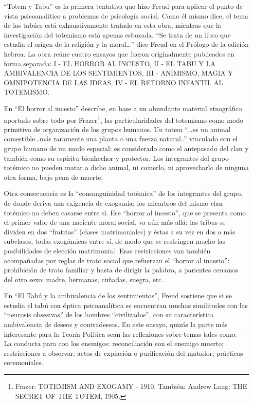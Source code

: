 \documentclass[
]{book}
\begin{document}
``Totem y Tabu'' es la primera tentativa que hizo Freud para aplicar el punto de vista psicoanalítico a problemas de psicología social. Como él mismo dice, el tema de los tabúes está exhaustivamente tratado en esta obra, mientras que la investigación del totemismo está apenas esbozada. ``Se trata de un libro que estudia el orígen de la religión y la moral\ldots{}'' dice Freud en el Prólogo de la edición hebrea. La obra reúne cuatro ensayos que fueron originalmente publicados en forma separada: I - EL HORROR AL INCESTO, II - EL TABU Y LA AMBIVALENCIA DE LOS SENTIMIENTOS, III - ANIMISMO, MAGIA Y OMNIPOTENCIA DE LAS IDEAS, IV - EL RETORNO INFANTIL AL TOTEMISMO.

En ``El horror al incesto'' describe, en base a un abundante material etnográfico aportado sobre todo por Frazer\footnote{Frazer: TOTEMISM AND EXOGAMY - 1910. También: Andrew Lang: THE SECRET OF THE TOTEM, 1905.}, las particularidades del totemismo como modo primitivo de organización de los grupos humanos. Un totem ``\ldots es un animal comestible\ldots más raramente una planta o una fuerza natural..'' vinculado con el grupo humano de un modo especial: es considerado como el antepasado del clan y también como su espíritu bienhechor y protector. Los integrantes del grupo totémico no pueden matar a dicho animal, ni comerlo, ni aprovecharlo de ninguna otra forma, bajo pena de muerte.

Otra consecuencia es la ``consanguinidad totémica'' de los integrantes del grupo, de donde deriva una exigencia de exogamia: los miembros del mismo clan totémico no deben casarse entre sí. Ese ``horror al incesto'', que se presenta como el primer valor de una naciente moral social, va aún más allá: las tribus se dividen en dos ``fratrias'' (clases matrimoniales) y éstas a su vez en dos o más subclases, todas exogámicas entre sí, de modo que se restringen mucho las posibilidades de elección matrimonial. Esas restricciones van también acompañadas por reglas de trato social que refuerzan el ``horror al incesto'': prohibición de trato familiar y hasta de dirigir la palabra, a parientes cercanos del otro sexo: madre, hermanas, cuñadas, suegra, etc.

En ``El Tabú y la ambivalencia de los sentimientos'', Freud sostiene que si se estudia el tabú con óptica psicoanalítica se encuentran muchas similitudes con las ``neurosis obsesivas'' de los hombres ``civilizados'', con su característica ambivalencia de deseos y contradeseos. En este ensayo, quizás la parte más interesante para la Teoría Política sean las reflexiones sobre temas tales como: - La conducta para con los enemigos: reconciliación con el enemigo muerto; restricciones a observar; actos de expiación o purificación del matador; prácticas ceremoniales.
\end{document}
